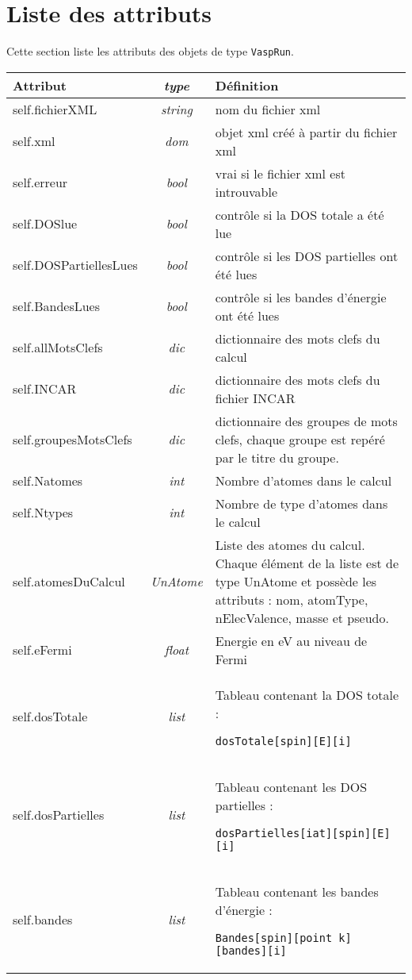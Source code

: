 \documentclass[10pt,a4paper,fleqn]{article}
\begin{document}
\newpage
\section{Liste des attributs}

Cette section liste les attributs des objets de type \verb!VaspRun!.

\begin{tabularx}{\textwidth}{|l|>{\itshape}c|X|}
	\hline
	\textbf{Attribut} & \textbf{type} & \centering \textbf{Définition} \tabularnewline
	\hline
	self.fichierXML & string & nom du fichier xml \\
	self.xml & dom & objet xml créé à partir du fichier xml \\
	\hline
	self.erreur & bool & vrai si le fichier xml est introuvable \\
	self.DOSlue &bool &  contrôle si la DOS totale a été lue \\
	self.DOSPartiellesLues & bool & contrôle si les DOS partielles ont été lues \\
	self.BandesLues & bool & contrôle si les bandes d'énergie ont été lues \\
	\hline
	self.allMotsClefs & dic & dictionnaire des mots clefs du calcul \\
	self.INCAR & dic & dictionnaire des mots clefs du fichier INCAR \\
	self.groupesMotsClefs & dic & dictionnaire des groupes de mots clefs, chaque groupe est repéré par
	le titre du groupe.\\
	\hline
	self.Natomes & int & Nombre d'atomes dans le calcul \\
	self.Ntypes & int & Nombre de type d'atomes dans le calcul \\
	self.atomesDuCalcul & UnAtome & Liste des atomes du calcul. Chaque élément de la liste est de type
	UnAtome et possède les attributs : nom, atomType, nElecValence, masse et pseudo. \\
	\hline
	self.eFermi & float & Energie en eV au niveau de Fermi \\
	self.dosTotale & list & Tableau contenant la DOS totale : \par
		\verb!dosTotale[spin][E][i]! \\
	self.dosPartielles & list & Tableau contenant les DOS partielles :\par 
	\verb!dosPartielles[iat][spin][E][i]! \\
	\hline
	self.bandes & list & Tableau contenant les bandes d'énergie :\par 
	\verb!Bandes[spin][point k][bandes][i]! \\

\end{tabularx}
\end{document}
